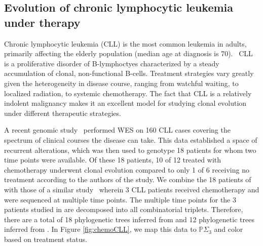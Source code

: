 \documentclass[a4paper,11pt]{article}
\begin{document}
\subsection{Evolution of chronic lymphocytic leukemia under therapy}\label{sec:CLL}

Chronic lymphocytic leukemia (CLL) is the most common leukemia in adults, primarily affecting the elderly population (median age at diagnosis is 70).~\cite{smith2011incidence}
CLL is a proliferative disorder of B-lymphoctyes characterized by a steady accumulation of clonal, non-functional B-cells.
Treatment strategies vary greatly given the heterogeneity in disease course, ranging from watchful waiting, to localized radiation, to systemic chemotherapy.
The fact that CLL is a relatively indolent malignancy makes it an
excellent model for studying clonal evolution under different
therapeutic strategies.~\cite{wang2015tumor}  

A recent genomic study~\cite{landau2013evolution} performed WES on 160 CLL cases covering the spectrum of clinical courses the disease can take.
This data established a space of recurrent alterations, which was then used to genotype 18 patients for whom two time points were available.
Of these 18 patients, 10 of 12 treated with chemotherapy underwent clonal evolution compared to only 1 of 6 receiving no treatment according to the authors of the study.
We combine the 18 patients of \cite{landau2013evolution} with those of a similar study~\cite{schuh2012monitoring} wherein 3 CLL patients received chemotherapy and were sequenced at multiple time points.
The multiple time points for the 3 patients studied in \cite{schuh2012monitoring} are decomposed into all combinatorial triplets.
Therefore, there are a total of 18 phylogenetic trees inferred from \cite{landau2013evolution} and 12 phylogenetic trees inferred from \cite{schuh2012monitoring}.
In Figure \ref{fig:chemoCLL}, we map this data to $\mathbb{P}\Sigma_3$ and color based on treatment status.
\end{document}
